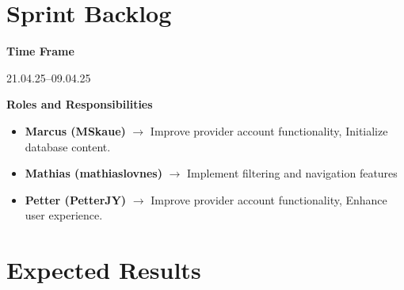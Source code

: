 \documentclass[a4paper,12pt]{article}
\begin{document}
\section*{Sprint Backlog}

\textbf{Time Frame}

21.04.25--09.04.25

\textbf{Roles and Responsibilities}

\begin{itemize}
    \item \textbf{Marcus (MSkaue)} $\rightarrow$ Improve provider account functionality, Initialize database content.
    \item \textbf{Mathias (mathiaslovnes)} $\rightarrow$ Implement filtering and navigation features
    \item \textbf{Petter (PetterJY)} $\rightarrow$ Improve provider account functionality, Enhance user experience. 
\end{itemize}

\section*{Expected Results}
\end{document}
